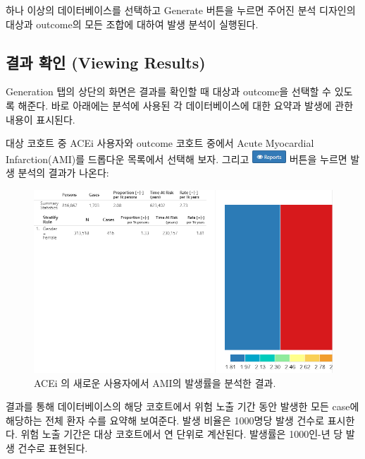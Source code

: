 \documentclass[11pt]{book}
\theoremstyle{definition}
\theoremstyle{definition}
\theoremstyle{definition}
\theoremstyle{remark}
\begin{document}
하나 이상의 데이터베이스를 선택하고 Generate 버튼을 누르면 주어진 분석
디자인의 대상과 outcome의 모든 조합에 대하여 발생 분석이 실행된다.

\subsection{결과 확인 (Viewing Results)}\label{--viewing-results-1}

Generation 탭의 상단의 화면은 결과를 확인할 때 대상과 outcome을 선택할
수 있도록 해준다. 바로 아래에는 분석에 사용된 각 데이터베이스에 대한
요약과 발생에 관한 내용이 표시된다.

대상 코호트 중 ACEi 사용자와 outcome 코호트 중에서 Acute Myocardial
Infarction(AMI)를 드롭다운 목록에서 선택해 보자. 그리고
\includegraphics{images/Characterization/atlasIncidenceReportButton.png}
버튼을 누르면 발생 분석의 결과가 나온다:

\begin{figure}

{\centering \includegraphics[width=1\linewidth]{images/Characterization/atlasIncidenceResults} 

}

\caption{ACEi 의 새로운 사용자에서 AMI의 발생률을 분석한 결과.}\label{fig:atlasIncidenceResults}
\end{figure}

결과를 통해 데이터베이스의 해당 코호트에서 위험 노출 기간 동안 발생한
모든 case에 해당하는 전체 환자 수를 요약해 보여준다. 발생 비율은
1000명당 발생 건수로 표시한다. 위험 노출 기간은 대상 코호트에서 연
단위로 계산된다. 발생률은 1000인-년 당 발생 건수로 표현된다.
\end{document}
